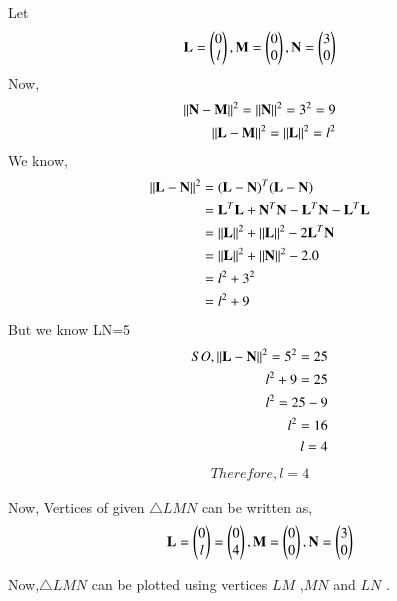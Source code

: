 \documentclass[journal,12pt,twocolumn]{IEEEtran}
\begin{document}
Let
\begin{align}
\textbf{L}=\begin{pmatrix}0 \\ l\end{pmatrix},
\textbf{M}=\begin{pmatrix}0 \\ 0\end{pmatrix} ,
\textbf{N}=\begin{pmatrix}3 \\ 0\end{pmatrix}
\end{align}
Now,
\begin{align}
\left\lVert\mathbf{N}-\mathbf{M}\right\rVert^2 = \left\lVert\mathbf{N}\right\rVert^2  = 3^2 =9
\\
\left\lVert\mathbf{L}-\mathbf{M}\right\rVert^2 = \left\lVert\mathbf{L}\right\rVert^2 =l^2
\end{align}
We know,
\begin{align}
\left\lVert\mathbf{L}-\mathbf{N}\right\rVert^2 &= ({\mathbf{L}-\mathbf{N}})^T({\mathbf{L}-\mathbf{N}})
\\
&= \mathbf{L}^T\mathbf{L}+\mathbf{N}^T\mathbf{N}-\mathbf{L}^T\mathbf{N} - \mathbf{L}^T\mathbf{L}
\\
&= \left\lVert\mathbf{L}\right\rVert^2 + \left\lVert\mathbf{L}\right\rVert^2 - 2\mathbf{L}^T\mathbf{N}
\\
&= \left\lVert\mathbf{L}\right\rVert^2 + \left\lVert\mathbf{N}\right\rVert^2-2.0
\\
&= l^2 + 3^2
\\
&=l^2+9
\end{align}
But we know LN=5 
\begin{align}
SO,
\left\lVert{\mathbf{L}-\mathbf{N}}\right\rVert^2=5^2=25
\\
l^2+9=25
\\
l^2=25-9
\\
l^2=16
\\
l=4
\end{align}
\begin{align}
Therefore,l=4
\end{align}

Now, Vertices of given $\triangle LMN$ can be written as,
\begin{align}
\mathbf{L} = \begin{pmatrix}0\\l\end{pmatrix}=\begin{pmatrix}0\\4\end{pmatrix}, \mathbf{M} = \begin{pmatrix}0\\0\end{pmatrix}, \mathbf{N} = \begin{pmatrix}3\\0\end{pmatrix}
\end{align}

Now,$\triangle LMN$ can be plotted using vertices $LM$ ,$MN$ and $LN$ .
\\
\\
\\


\end{document}
